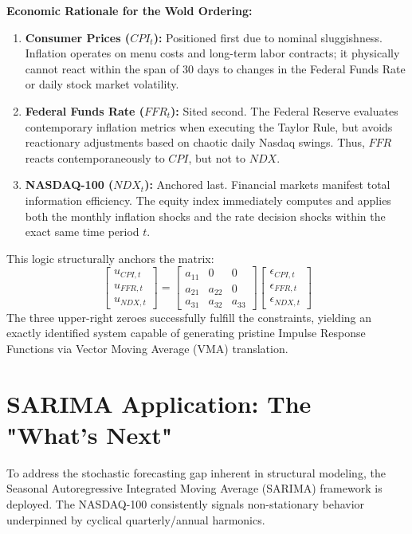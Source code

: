 \documentclass[12pt,a4paper]{report}
\begin{document}
\textbf{Economic Rationale for the Wold Ordering:}
\begin{enumerate}
    \item \textbf{Consumer Prices ($CPI_t$):} Positioned first due to nominal sluggishness. Inflation operates on menu costs and long-term labor contracts; it physically cannot react within the span of 30 days to changes in the Federal Funds Rate or daily stock market volatility.
    \item \textbf{Federal Funds Rate ($FFR_t$):} Sited second. The Federal Reserve evaluates contemporary inflation metrics when executing the Taylor Rule, but avoids reactionary adjustments based on chaotic daily Nasdaq swings. Thus, $FFR$ reacts contemporaneously to $CPI$, but not to $NDX$.
    \item \textbf{NASDAQ-100 ($NDX_t$):} Anchored last. Financial markets manifest total information efficiency. The equity index immediately computes and applies both the monthly inflation shocks and the rate decision shocks within the exact same time period $t$.
\end{enumerate}

This logic structurally anchors the matrix:
\begin{equation}
\begin{bmatrix}
u_{CPI, t} \\
u_{FFR, t} \\
u_{NDX, t}
\end{bmatrix}
=
\begin{bmatrix}
a_{11} & 0 & 0 \\
a_{21} & a_{22} & 0 \\
a_{31} & a_{32} & a_{33}
\end{bmatrix}
\begin{bmatrix}
\epsilon_{CPI, t} \\
\epsilon_{FFR, t} \\
\epsilon_{NDX, t}
\end{bmatrix}
\end{equation}
The three upper-right zeroes successfully fulfill the constraints, yielding an exactly identified system capable of generating pristine Impulse Response Functions via Vector Moving Average (VMA) translation.

\section{SARIMA Application: The "What's Next"}
To address the stochastic forecasting gap inherent in structural modeling, the Seasonal Autoregressive Integrated Moving Average (SARIMA) framework is deployed. The NASDAQ-100 consistently signals non-stationary behavior underpinned by cyclical quarterly/annual harmonics.
\end{document}
